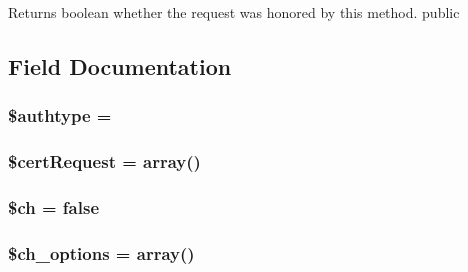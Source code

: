 \begin{DoxyReturn}{Returns}
boolean whether the request was honored by this method.  public 
\end{DoxyReturn}


\subsection{Field Documentation}
\hypertarget{classsoap__transport__http_ae81871b02c5845eb3a1071eb24e1f29c}{}
\subsubsection[{\$authtype}]{\setlength{\rightskip}{0pt plus 5cm}\$authtype = \textquotesingle{}\textquotesingle{}}\label{classsoap__transport__http_ae81871b02c5845eb3a1071eb24e1f29c}
\hypertarget{classsoap__transport__http_adcbe9a77644bad97ed599d1651bd2719}{}
\subsubsection[{\$cert\+Request}]{\setlength{\rightskip}{0pt plus 5cm}\$cert\+Request = array()}\label{classsoap__transport__http_adcbe9a77644bad97ed599d1651bd2719}
\hypertarget{classsoap__transport__http_a696b903bbc5c02914bdd402e91826eca}{}
\subsubsection[{\$ch}]{\setlength{\rightskip}{0pt plus 5cm}\$ch = false}\label{classsoap__transport__http_a696b903bbc5c02914bdd402e91826eca}
\hypertarget{classsoap__transport__http_a661168c70aec028c27911cfce3bd95d0}{}
\subsubsection[{\$ch\+\_\+options}]{\setlength{\rightskip}{0pt plus 5cm}\$ch\+\_\+options = array()}\label{classsoap__transport__http_a661168c70aec028c27911cfce3bd95d0}
\hypertarget{classsoap__transport__http_a7852708352a061a957ebd0fe6f4b0597}{}
